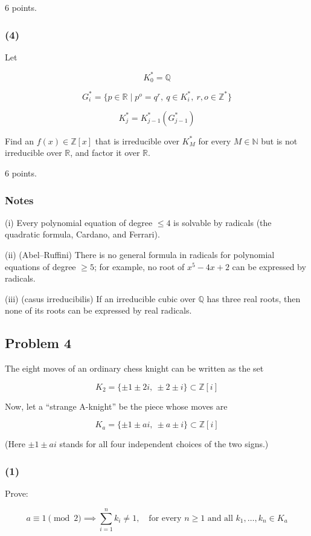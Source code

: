 \documentclass[11pt,a4paper]{article}
\begin{document}
6 points.

\subsubsection{(4)}
Let

$$K^*_0=\mathbb{Q}$$

$$G^*_i=\{p\in \mathbb{R}\mid p^o=q^r,\ q\in K^*_i,\ r,o\in \mathbb{Z}^*\}$$

$$K^*_j=K^*_{j-1}(G^*_{j-1})$$

Find an $f(x) \in \mathbb{Z}[x]$ that is irreducible over $K^*_M$ for every
$M \in \mathbb{N}$ but is not irreducible over $\mathbb{R}$, and factor it
over $\mathbb{R}$.

6 points.

\subsubsection*{Notes}

(i) Every polynomial equation of degree $\le4$ is solvable by
radicals (the quadratic formula, Cardano, and Ferrari).

(ii) (Abel--Ruffini) There is no general formula in radicals for
polynomial equations of degree $\ge5$; for example, no root
of $x^5-4x+2$ can be expressed by radicals.

(iii) (casus irreducibilis) If an irreducible cubic over
$\mathbb{Q}$ has three real roots, then none of its roots can
be expressed by real radicals.

\subsection{Problem 4}

The eight moves of an ordinary chess knight can be written as the set

$$K_2=\{\pm1\pm 2i,\ \pm 2 \pm i\}\subset\mathbb{Z}[i]$$

Now, let a ``strange A-knight'' be the piece whose moves are

$$K_a=\{\pm1\pm ai,\ \pm a \pm i\}\subset\mathbb{Z}[i]$$

(Here $\pm1\pm ai$ stands for all four independent choices of the two signs.)

\subsubsection{(1)}
Prove:

$$a \equiv 1 \pmod{2}\implies\sum_{i=1}^n k_i\neq 1,
\quad\text{for every } n\ge 1 \text{ and all } k_1,\ldots,k_n\in K_a$$
\end{document}
